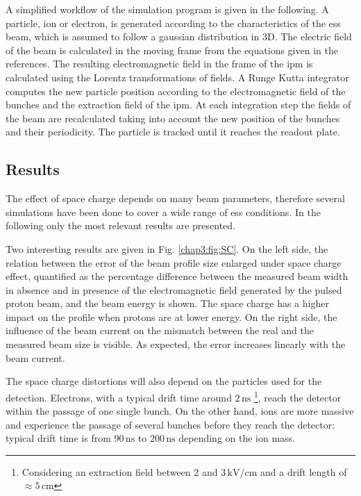 \begin{refsection}
  
  A simplified workflow of the simulation program is given in the following. A particle, ion or electron, is generated according to the characteristics of the \acrshort{ess} beam, which is assumed to follow a gaussian distribution in 3D. The electric field of the beam is calculated in the moving frame from the equations given in the references. The resulting electromagnetic field in the frame of the \acrshort{ipm} is calculated using the Lorentz transformations of fields. A Runge Kutta integrator computes the new particle position according to the electromagnetic field of the bunches and the extraction field of the \acrshort{ipm}. At each integration step the fields of the beam are recalculated taking into account the new position of the bunches and their periodicity. The particle is tracked until it reaches the readout plate.

  \subsection{Results}
  The effect of space charge depends on many beam parameters, therefore several simulations have been done to cover a wide range of \acrshort{ess} conditions. In the following only the most relevant results are presented. %
  
  Two interesting results are given in Fig. \ref{chap3:fig:SC}. On the left side, the relation between the error of the beam profile size enlarged under space charge effect, quantified as the percentage difference between the measured beam width in absence and in presence of the electromagnetic field generated by the pulsed proton beam, and the beam energy is shown. The space charge has a higher impact on the profile when protons are at lower energy. On the right side, the influence of the beam current on the mismatch between the real and the measured beam size is visible. As expected, the error increases linearly with the beam current.
  

  The space charge distortions will also depend on the particles used for the detection. Electrons, with a typical drift time around $2\,\mathrm{ns}$ \footnote{Considering an extraction field between $2$ and $3\,\mathrm{kV/cm}$ and a drift length of $\approx 5\,\mathrm{cm}$}, reach the detector within the passage of one single bunch. On the other hand, ions are more massive and experience the passage of several bunches before they reach the detector: typical drift time is from $90\,\mathrm{ns}$ to $200\,\mathrm{ns}$ depending on the ion mass. 


\end{refsection}
